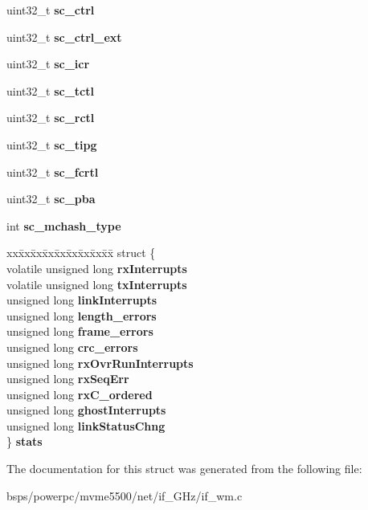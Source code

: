 \begin{DoxyCompactItemize}
uint32\+\_\+t {\bfseries sc\+\_\+ctrl}
\item 
\mbox{\label{structwm__softc_a42afd6be0dc6064d1a36eae790390b2c}} 
uint32\+\_\+t {\bfseries sc\+\_\+ctrl\+\_\+ext}
\item 
\mbox{\label{structwm__softc_a0e6ce0fd0dab2c9192113b8c3136280d}} 
uint32\+\_\+t {\bfseries sc\+\_\+icr}
\item 
\mbox{\label{structwm__softc_a7628e6660a1be7606427adc6fcdca874}} 
uint32\+\_\+t {\bfseries sc\+\_\+tctl}
\item 
\mbox{\label{structwm__softc_abe7de283069a2cbc9df29cfd0e23b6c3}} 
uint32\+\_\+t {\bfseries sc\+\_\+rctl}
\item 
\mbox{\label{structwm__softc_ac9c8a0189ddfd94e5ea8978e47e4e2d4}} 
uint32\+\_\+t {\bfseries sc\+\_\+tipg}
\item 
\mbox{\label{structwm__softc_ac9b7f0289cfb6eb2449974a5f156d01f}} 
uint32\+\_\+t {\bfseries sc\+\_\+fcrtl}
\item 
\mbox{\label{structwm__softc_a08f2ee42344695141f0eb4407577c250}} 
uint32\+\_\+t {\bfseries sc\+\_\+pba}
\item 
\mbox{\label{structwm__softc_a210493b98d7509ada19469eb19e10f24}} 
int {\bfseries sc\+\_\+mchash\+\_\+type}
\item 
\mbox{\label{structwm__softc_acb38668bf8e7a4425f6e1452e1fd583f}} 
\begin{tabbing}
xx\=xx\=xx\=xx\=xx\=xx\=xx\=xx\=xx\=\kill
struct \{\\
\>volatile unsigned long {\bfseries rxInterrupts}\\
\>volatile unsigned long {\bfseries txInterrupts}\\
\>unsigned long {\bfseries linkInterrupts}\\
\>unsigned long {\bfseries length\_errors}\\
\>unsigned long {\bfseries frame\_errors}\\
\>unsigned long {\bfseries crc\_errors}\\
\>unsigned long {\bfseries rxOvrRunInterrupts}\\
\>unsigned long {\bfseries rxSeqErr}\\
\>unsigned long {\bfseries rxC\_ordered}\\
\>unsigned long {\bfseries ghostInterrupts}\\
\>unsigned long {\bfseries linkStatusChng}\\
\} {\bfseries stats}\\

\end{tabbing}\end{DoxyCompactItemize}


The documentation for this struct was generated from the following file\+:\begin{DoxyCompactItemize}
\item 
bsps/powerpc/mvme5500/net/if\+\_\+G\+Hz/if\+\_\+wm.\+c\end{DoxyCompactItemize}
